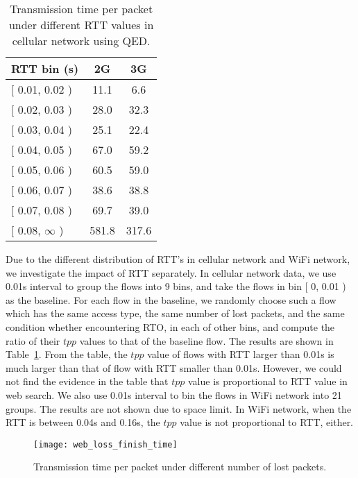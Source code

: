 \begin{table}[th]
\centering
\renewcommand{\arraystretch}{1.2}
\caption{Transmission time per packet under different RTT values in cellular network using QED.}
\label{tab:web_cellular_rtt_qed}
\begin{tabular}{l|c|c}
\toprule
RTT bin (s) & 2G & 3G \\
\midrule
$[$ 0.01, 0.02 ) & 11.1 & 6.6 \\
\hline
$[$ 0.02, 0.03 ) & 28.0 & 32.3 \\
\hline
$[$ 0.03, 0.04 ) & 25.1 & 22.4 \\
\hline
$[$ 0.04, 0.05 ) & 67.0 & 59.2 \\
\hline
$[$ 0.05, 0.06 ) & 60.5 & 59.0 \\
\hline
$[$ 0.06, 0.07 ) & 38.6 & 38.8 \\
\hline
$[$ 0.07, 0.08 ) & 69.7 & 39.0 \\
\hline
$[$ 0.08, $\infty$ ) & 581.8 & 317.6 \\
\bottomrule
\end{tabular}
\end{table}

Due to the different distribution of RTT's in cellular network and WiFi network, we investigate the impact of RTT separately. In cellular network data, we use 0.01s interval to group the flows into 9 bins, and take the flows in bin $[$ 0, 0.01 ) as the baseline. For each flow in the baseline, we randomly choose such a flow which has the same access type, the same number of lost packets, and the same condition whether encountering RTO, in each of other bins, and compute the ratio of their $tpp$ values to that of the baseline flow. The results are shown in Table~\ref{tab:web_cellular_rtt_qed}. From the table, the $tpp$ value of flows with RTT larger than 0.01s is much larger than that of flow with RTT smaller than 0.01s. However, we could not find the evidence in the table that $tpp$ value is proportional to RTT value in web search. We also use 0.01s interval to bin the flows in WiFi network into 21 groups. The results are not shown due to space limit. In WiFi network, when the RTT is between 0.04s and 0.16s, the $tpp$ value is not proportional to RTT, either. 

\begin{figure}[th]
\centering
\texttt{[image: web\_loss\_finish\_time]}
\caption{Transmission time per packet under different number of lost packets.}
\label{fig:web_loss_finish_time}
\end{figure}

